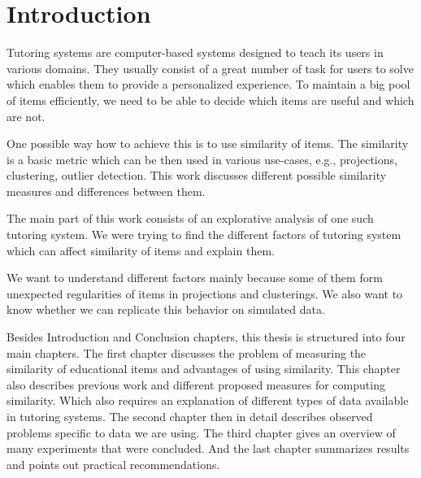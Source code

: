 \documentclass[
  digital, %
  table,   %
  nolof,     %
  nolot,     %
  nocover,
  color,
  final, %
]{fithesis3}
\begin{document}
\newcommand{\ppl}[1]{\textcolor[rgb]{0.6,0.2,1.0}{#1}}
\newcommand{\umimeCesky}{Umíme česky}
\newcommand{\cviceniB}{``Vyjmenovaná slova po B''}




\chapter*{Introduction}


Tutoring systems are computer-based systems designed to teach its users in various domains. They usually consist of a great number of task for users to solve which enables them to provide a personalized experience. To maintain a big pool of items efficiently, we need to be able to decide which items are useful and which are not.


One possible way how to achieve this is to use similarity of items. The similarity is a basic metric which can be then used in various use-cases, e.g., projections, clustering, outlier detection. This work discusses different possible similarity measures and differences between them.


The main part of this work consists of an explorative analysis of one such tutoring system. We were trying to find the different factors of tutoring system which can affect similarity of items and explain them.


We want to understand different factors mainly because some of them form unexpected regularities of items in projections and clusterings. We also want to know whether we can replicate this behavior on simulated data.


Besides Introduction and Conclusion chapters, this thesis is structured into four main chapters. The first chapter discusses the problem of measuring the similarity of educational items and advantages of using similarity. This chapter also describes previous work and different proposed measures for computing similarity. Which also requires an explanation of different types of data available in tutoring systems. The second chapter then in detail describes observed problems specific to data we are using. The third chapter gives an overview of many experiments that were concluded. And the last chapter summarizes results and points out practical recommendations.
\end{document}

